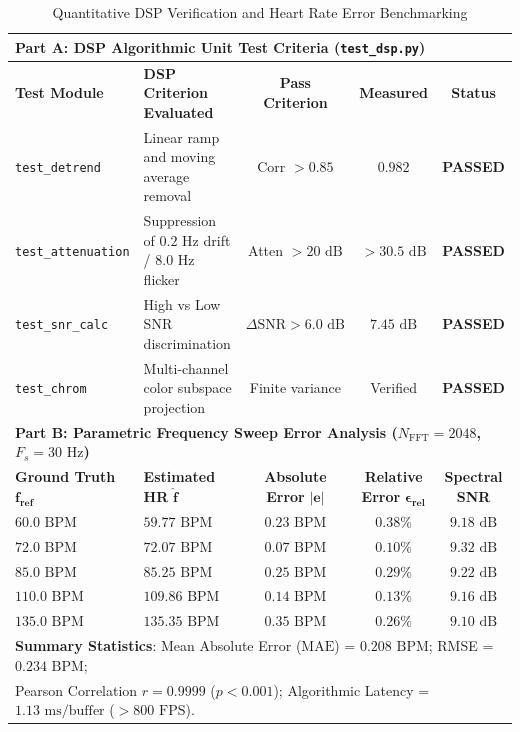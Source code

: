 \documentclass[11pt,a4paper]{report}
\begin{document}
\begin{table}[!htbp]
\centering
\small
\caption{Quantitative DSP Verification and Heart Rate Error Benchmarking}
\label{tab:combined_benchmarks}
\begin{tabularx}{\textwidth}{lXccc}
\toprule
\multicolumn{5}{l}{\textbf{Part A: DSP Algorithmic Unit Test Criteria (\texttt{test\_dsp.py})}} \\
\midrule
\textbf{Test Module} & \textbf{DSP Criterion Evaluated} & \textbf{Pass Criterion} & \textbf{Measured} & \textbf{Status} \\
\midrule
\texttt{test\_detrend} & Linear ramp and moving average removal & Corr $> 0.85$ & $0.982$ & \textbf{PASSED} \\
\texttt{test\_attenuation} & Suppression of $0.2\text{ Hz}$ drift / $8.0\text{ Hz}$ flicker & Atten $> 20\text{ dB}$ & $> 30.5\text{ dB}$ & \textbf{PASSED} \\
\texttt{test\_snr\_calc} & High vs Low SNR discrimination & $\Delta\text{SNR} > 6.0\text{ dB}$ & $7.45\text{ dB}$ & \textbf{PASSED} \\
\texttt{test\_chrom} & Multi-channel color subspace projection & Finite variance & Verified & \textbf{PASSED} \\
\midrule
\multicolumn{5}{l}{\textbf{Part B: Parametric Frequency Sweep Error Analysis ($N_{\text{FFT}} = 2048$, $F_s = 30\text{ Hz}$)}} \\
\midrule
\textbf{Ground Truth} $\bm{f_{\text{ref}}}$ & \textbf{Estimated HR} $\bm{\hat{f}}$ & \textbf{Absolute Error} $\bm{|e|}$ & \textbf{Relative Error} $\bm{\epsilon_{\text{rel}}}$ & \textbf{Spectral SNR} \\
\midrule
$60.0\text{ BPM}$ & $59.77\text{ BPM}$ & $0.23\text{ BPM}$ & $0.38\%$ & $9.18\text{ dB}$ \\
$72.0\text{ BPM}$ & $72.07\text{ BPM}$ & $0.07\text{ BPM}$ & $0.10\%$ & $9.32\text{ dB}$ \\
$85.0\text{ BPM}$ & $85.25\text{ BPM}$ & $0.25\text{ BPM}$ & $0.29\%$ & $9.22\text{ dB}$ \\
$110.0\text{ BPM}$ & $109.86\text{ BPM}$ & $0.14\text{ BPM}$ & $0.13\%$ & $9.16\text{ dB}$ \\
$135.0\text{ BPM}$ & $135.35\text{ BPM}$ & $0.35\text{ BPM}$ & $0.26\%$ & $9.10\text{ dB}$ \\
\midrule
\multicolumn{5}{l}{\textbf{Summary Statistics}: Mean Absolute Error ($\text{MAE}$) = $0.208\text{ BPM}$; RMSE = $0.234\text{ BPM}$;} \\
\multicolumn{5}{l}{Pearson Correlation $r = 0.9999$ ($p < 0.001$); Algorithmic Latency = $1.13\text{ ms/buffer}$ ($> 800\text{ FPS}$).} \\
\bottomrule
\end{tabularx}
\end{table}
\end{document}
